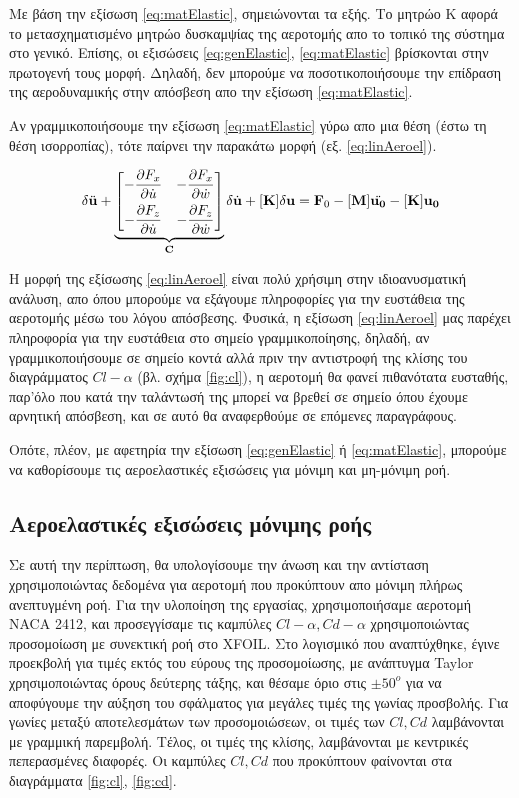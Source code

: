 Με βάση την εξίσωση \ref{eq:matElastic}, σημειώνονται τα εξής. Το μητρώο K αφορά το μετασχηματισμένο μητρώο δυσκαμψίας της αεροτομής απο το τοπικό της σύστημα στο γενικό. Επίσης, οι εξισώσεις \ref{eq:genElastic}, \ref{eq:matElastic} βρίσκονται στην πρωτογενή τους μορφή. Δηλαδή, δεν μπορούμε να ποσοτικοποιήσουμε την επίδραση της αεροδυναμικής στην απόσβεση απο την εξίσωση \ref{eq:matElastic}.

Αν γραμμικοποιήσουμε την εξίσωση \ref{eq:matElastic} γύρω απο μια θέση (έστω τη θέση ισορροπίας), τότε παίρνει την παρακάτω μορφή (εξ. \ref{eq:linAeroel}).

\begin{equation}
    [\mathbf{M}]\delta\ddot{\mathbf{u}} + 
    \underbrace{
    \begin{bmatrix}
    -\dpart{F_x}{\dot{u}} & -\dpart{F_x}{\dot{w}}\\[8pt]
    -\dpart{F_z}{\dot{u}} & -\dpart{F_z}{\dot{w}}
    \end{bmatrix}
    }_{\mathbf{C}}
    \delta\dot{\mathbf{u}} + [\mathbf{K}]\delta\mathbf{u} = 
    \mathbf{F}_0 -[\mathbf{M}]\ddot{\mathbf{u_0}} - [\mathbf{K}]\mathbf{u_0}
    \label{eq:linAeroel}
\end{equation}

Η μορφή της εξίσωσης \ref{eq:linAeroel} είναι πολύ χρήσιμη στην ιδιοανυσματική ανάλυση, απο όπου μπορούμε να εξάγουμε πληροφορίες για την ευστάθεια της αεροτομής μέσω του λόγου απόσβεσης. Φυσικά, η εξίσωση \ref{eq:linAeroel} μας παρέχει πληροφορία για την ευστάθεια στο σημείο γραμμικοποίησης, δηλαδή, αν γραμμικοποιήσουμε σε σημείο κοντά αλλά πριν την αντιστροφή της κλίσης του διαγράμματος $Cl-\alpha$ (βλ. σχήμα \ref{fig:cl}), η αεροτομή θα φανεί πιθανότατα ευσταθής, παρ'όλο που κατά την ταλάντωσή της μπορεί να βρεθεί σε σημείο όπου έχουμε αρνητική απόσβεση, και σε αυτό θα αναφερθούμε σε επόμενες παραγράφους.

Οπότε, πλέον, με αφετηρία την εξίσωση \ref{eq:genElastic} ή \ref{eq:matElastic}, μπορούμε να καθορίσουμε τις αεροελαστικές εξισώσεις για μόνιμη και μη-μόνιμη ροή.

\subsection{Αεροελαστικές εξισώσεις μόνιμης ροής}

Σε αυτή την περίπτωση, θα υπολογίσουμε την άνωση και την αντίσταση χρησιμοποιώντας δεδομένα για αεροτομή που προκύπτουν απο μόνιμη πλήρως ανεπτυγμένη ροή. Για την υλοποίηση της εργασίας, χρησιμοποιήσαμε αεροτομή NACA 2412, και προσεγγίσαμε τις  καμπύλες $Cl-\alpha, Cd-\alpha$ χρησιμοποιώντας προσομοίωση με συνεκτική ροή στο XFOIL. Στο λογισμικό που αναπτύχθηκε, έγινε προεκβολή για τιμές εκτός του εύρους της προσομοίωσης, με ανάπτυγμα Taylor χρησιμοποιώντας όρους δεύτερης τάξης, και θέσαμε όριο στις $\pm50^o$ για να αποφύγουμε την αύξηση του σφάλματος για μεγάλες τιμές της γωνίας προσβολής. Για γωνίες μεταξύ αποτελεσμάτων των προσομοιώσεων, οι τιμές των $Cl, Cd$ λαμβάνονται με γραμμική παρεμβολή. Τέλος, οι τιμές της κλίσης, λαμβάνονται με κεντρικές πεπερασμένες διαφορές. Οι καμπύλες $Cl, Cd$ που προκύπτουν φαίνονται στα διαγράμματα \ref{fig:cl}, \ref{fig:cd}.

